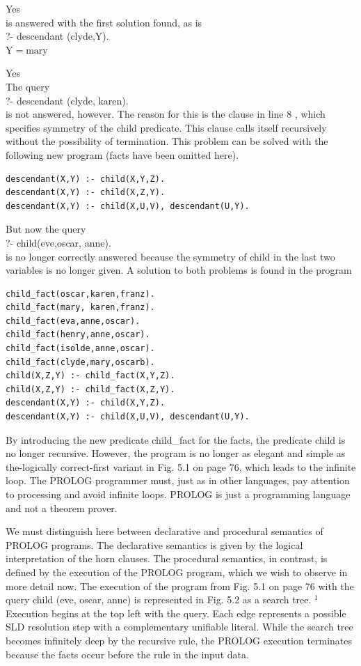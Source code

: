 \documentclass[10pt]{book}
\begin{document}
Yes\\
is answered with the first solution found, as is\\
?- descendant (clyde,Y).\\
$\mathrm{Y}=\mathrm{mar} \mathrm{y}$

Yes\\
The query\\
?- descendant (clyde, karen).\\
is not answered, however. The reason for this is the clause in line 8 , which specifies symmetry of the child predicate. This clause calls itself recursively without the possibility of termination. This problem can be solved with the following new program (facts have been omitted here).

\begin{verbatim}
descendant(X,Y) :- child(X,Y,Z).
descendant(X,Y) :- child(X,Z,Y).
descendant(X,Y) :- child(X,U,V), descendant(U,Y).
\end{verbatim}

But now the query\\
?- child(eve,oscar, anne).\\
is no longer correctly answered because the symmetry of child in the last two variables is no longer given. A solution to both problems is found in the program

\begin{verbatim}
child_fact(oscar,karen,franz).
child_fact(mary, karen,franz).
child_fact(eva,anne,oscar).
child_fact(henry,anne,oscar).
child_fact(isolde,anne,oscar).
child_fact(clyde,mary,oscarb).
child(X,Z,Y) :- child_fact(X,Y,Z).
child(X,Z,Y) :- child_fact(X,Z,Y).
descendant(X,Y) :- child(X,Y,Z).
descendant(X,Y) :- child(X,U,V), descendant(U,Y).
\end{verbatim}

By introducing the new predicate child\_fact for the facts, the predicate child is no longer recursive. However, the program is no longer as elegant and simple as the-logically correct-first variant in Fig. 5.1 on page 76, which leads to the infinite loop. The PROLOG programmer must, just as in other languages, pay attention to processing and avoid infinite loops. PROLOG is just a programming language and not a theorem prover.

We must distinguish here between declarative and procedural semantics of PROLOG programs. The declarative semantics is given by the logical interpretation of the horn clauses. The procedural semantics, in contrast, is defined by the execution of the PROLOG program, which we wish to observe in more detail now. The execution of the program from Fig. 5.1 on page 76 with the query child (eve, oscar, anne) is represented in Fig. 5.2 as a search tree. ${ }^{1}$ Execution begins at the top left with the query. Each edge represents a possible SLD resolution step with a complementary unifiable literal. While the search tree becomes infinitely deep by the recursive rule, the PROLOG execution terminates because the facts occur before the rule in the input data.
\end{document}
